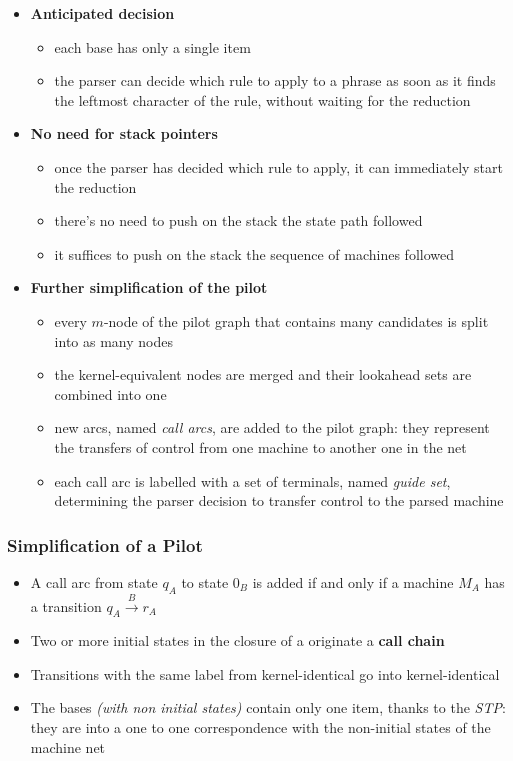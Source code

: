 \documentclass[english]{article}
\begin{document}
\begin{itemize}
  \item \textbf{Anticipated decision}
        \begin{itemize}[label=\(\rightarrow\)]
          \item each \mstate base has only a single item
          \item the parser can decide which rule to apply to a phrase as soon as it finds the leftmost character of the rule, without waiting for the reduction
        \end{itemize}
  \item \textbf{No need for stack pointers}
        \begin{itemize}[label=\(\rightarrow\)]
          \item once the parser has decided which rule to apply, it can immediately start the reduction
          \item there's no need to push on the stack the state path followed
          \item it suffices to push on the stack the sequence of machines followed
        \end{itemize}
  \item \textbf{Further simplification of the pilot}
        \begin{itemize}[label=\(\rightarrow\)]
          \item every \(m\)-node of the pilot graph that contains many candidates is split into as many nodes
          \item the kernel-equivalent nodes are merged and their lookahead sets are combined into one
          \item new arcs, named \textit{call arcs}, are added to the pilot graph: they represent the transfers of control from one machine to another one in the net
          \item each call arc is labelled with a set of terminals, named \textit{guide set}, determining the parser decision to transfer control to the parsed machine
        \end{itemize}
\end{itemize}

\subsubsection[Simplification of a ELL(1) Pilot]{Simplification of a \ello Pilot}

\begin{itemize}
  \item A call arc from state \(q_A\) to state \(0_B\) is added if and only if a machine \(M_A\) has a transition \(q_A \xrightarrow{B} r_A\)
  \item Two or more initial states in the closure of a \mstate originate a \textbf{call chain}
  \item Transitions with the same label from kernel-identical \mstates go into kernel-identical \mstates
  \item The \mstate bases \textit{(with non initial states)} contain only one item, thanks to the \textit{STP}: they are into a one to one correspondence with the non-initial states of the machine net
\end{itemize}
\end{document}
